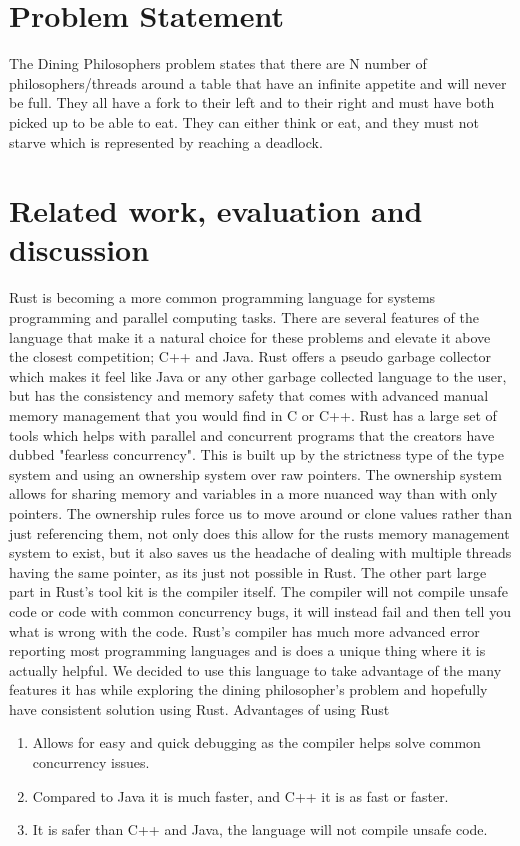 \documentclass[conference]{IEEEtran}
\begin{document}
	\section{Problem Statement}
	The Dining Philosophers problem states that there are N number of philosophers/threads around a table that have an infinite appetite and will never be full. They all have a fork to their left and to their right and must have both picked up to be able to eat. They can either think or eat, and they must not starve which is represented by reaching a deadlock.
	\section{Related work, evaluation and discussion}
	Rust is becoming a more common programming language for systems programming and parallel computing tasks. There are several features of the language that make it a natural choice for these problems and elevate it above the closest competition; C++ and Java. Rust offers a pseudo garbage collector which makes it feel like Java or any other garbage collected language to the user, but has the consistency and memory safety that comes with advanced manual memory management that you would find in C or C++. Rust has a large set of tools which helps with parallel and concurrent programs that the creators have dubbed "fearless concurrency". This is built up by the strictness type of the type system and using an ownership system over raw pointers. The ownership system allows for sharing memory and variables in a more nuanced way than with only pointers. The ownership rules force us to move around or clone values rather than just referencing them, not only does this allow for the rusts memory management system to exist, but it also saves us the headache of dealing with multiple threads having the same pointer, as its just not possible in Rust. The other part large part in Rust's tool kit is the compiler itself. The compiler will not compile unsafe code or code with common concurrency bugs, it will instead fail and then tell you what is wrong with the code. Rust's compiler has much more advanced error reporting most programming languages and is does a unique thing where it is actually helpful. We decided to use this language to take advantage of the many features it has while exploring the dining philosopher's problem and hopefully have consistent solution using Rust.
	\linebreak
	Advantages of using Rust
	\begin{enumerate}
		\item Allows for easy and quick debugging as the compiler helps solve common concurrency issues.
		\item Compared to Java it is much faster, and C++ it is as fast or faster.
		\item It is safer than C++ and Java, the language will not compile unsafe code.
	\end{enumerate}
\end{document}
